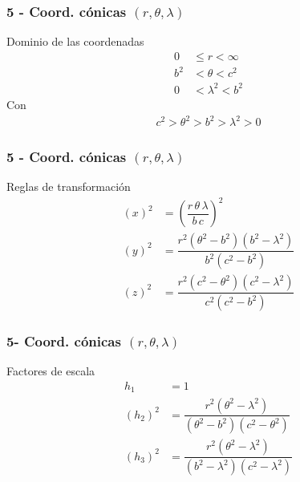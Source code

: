 \documentclass[12pt]{beamer}
\begin{document}
\begin{frame}
\frametitle{5 - Coord. cónicas $(r, \theta, \lambda)$}
\fontsize{12}{12}\selectfont
Dominio de las coordenadas
\begin{align*}
0 &\leq r < \infty \\
b^{2} &< \theta < c^{2} \\
0 &< \lambda^{2} < b^{2}
\end{align*}
Con
\begin{align*}
c^{2} > \theta^{2} > b^{2} > \lambda^{2} > 0
\end{align*}
\end{frame}
\begin{frame}
\frametitle{5 - Coord. cónicas $(r, \theta, \lambda)$}
\fontsize{12}{12}\selectfont
Reglas de transformación
\begin{align*}
(x)^{2} &= \left( \dfrac{r \, \theta \, \lambda}{b \, c} \right)^{2} \\[0.5em]
(y)^{2} &= \dfrac{r^{2} (\theta^{2} - b^{2})(b^{2} - \lambda^{2})}{b^{2}(c^{2} - b^{2})} \\[0.5em]
(z)^{2} &= \dfrac{r^{2} (c^{2} - \theta^{2})(c^{2} - \lambda^{2})}{c^{2} (c^{2} - b^{2})}
\end{align*}
\end{frame}
\begin{frame}
\frametitle{5- Coord. cónicas $(r, \theta, \lambda)$}
\fontsize{12}{12}\selectfont
Factores de escala
\begin{align*}
h_{1} &= 1\\
(h_{2})^{2} &= \dfrac{r^{2} (\theta^{2} - \lambda^{2})}{(\theta^{2} - b^{2})(c^{2} - \theta^{2})} \\[0.5em]
(h_{3})^{2} &= \dfrac{r^{2} (\theta^{2} - \lambda^{2})}{(b^{2} - \lambda^{2})(c^{2} - \lambda^{2})}
\end{align*}
\end{frame}
\end{document}
